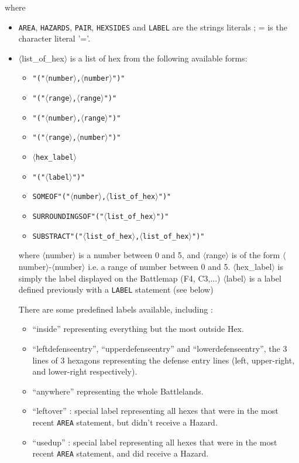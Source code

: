 \documentclass{article}
\begin{document}
where

\begin{itemize}

\item \texttt{AREA}, \texttt{HAZARDS}, \texttt{PAIR}, \texttt{HEXSIDES} and \texttt{LABEL} are the strings literals ;
 = is the character literal '='.

\item $\langle$list\_of\_hex$\rangle$ is a list of hex from the following available forms:
\begin{itemize}
\item \texttt{"("$\langle$number$\rangle$,$\langle$number$\rangle$")"}
\item \texttt{"("$\langle$range$\rangle$,$\langle$range$\rangle$")"}
\item \texttt{"("$\langle$number$\rangle$,$\langle$range$\rangle$")"}
\item \texttt{"("$\langle$range$\rangle$,$\langle$number$\rangle$")"}
\item \texttt{$\langle$hex\_label$\rangle$}
\item \texttt{"("$\langle$label$\rangle$")"}
\item \texttt{SOMEOF"("$\langle$number$\rangle$,$\langle$list\_of\_hex$\rangle$")"}
\item \texttt{SURROUNDINGSOF"("$\langle$list\_of\_hex$\rangle$")"}
\item \texttt{SUBSTRACT"("$\langle$list\_of\_hex$\rangle$,$\langle$list\_of\_hex$\rangle$")"}
\end{itemize}
 where $\langle$number$\rangle$ is a number between 0 and 5, and $\langle$range$\rangle$ is of the form
 $\langle$number$\rangle$-$\langle$number$\rangle$
 i.e. a range of number between 0 and 5.
 $\langle$hex\_label$\rangle$ is simply the label displayed on the Battlemap (F4, C3,...)
 $\langle$label$\rangle$ is a label defined previously with a \texttt{LABEL} statement (see below)

 There are some predefined labels available, including :
\begin{itemize}
\item ``inside'' representing everything but the most outside Hex.
\item ``leftdefenseentry'', ``upperdefenseentry'' and ``lowerdefenseentry'',
 the 3 lines of 3 hexagons representing the defense entry lines
 (left, upper-right, and lower-right respectively).
\item ``anywhere'' representing the whole Battlelands.
\item ``leftover'' : special label representing all hexes that were in
 the most recent \texttt{AREA} statement, but didn't receive a Hazard.
\item ``usedup'' : special label representing all hexes that were in
 the most recent \texttt{AREA} statement, and did receive a Hazard.
\end{itemize}
 

\end{itemize}
\end{document}
